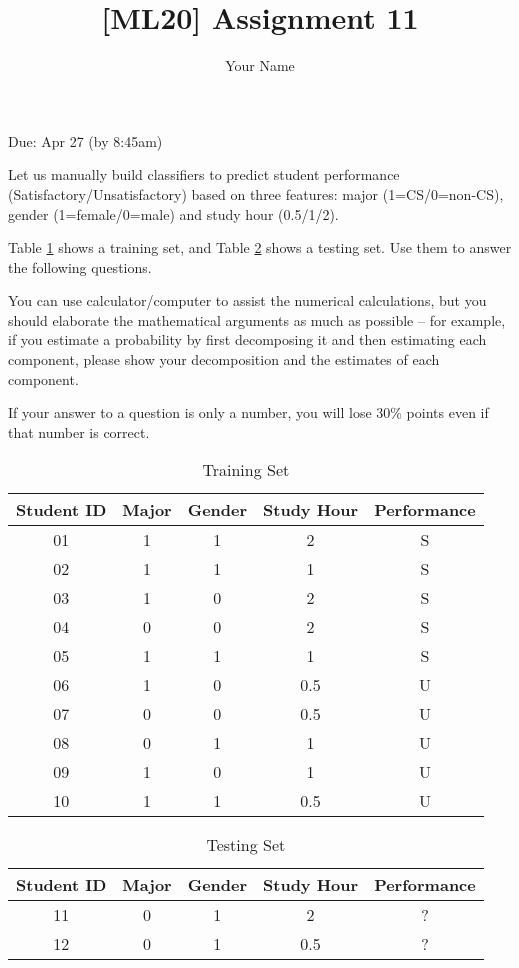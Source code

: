 \documentclass{llncs}
\title{[ML20] Assignment 11}
\author{Your Name}
\institute{}
\begin{document}
\maketitle 

\setlength\parindent{0pt} 
\setlength{\parskip}{10pt}

Due: Apr 27 (by 8:45am) 

Let us manually build classifiers to predict 
student performance (Satisfactory/Unsatisfactory) 
based on three features: major (1=CS/0=non-CS), 
gender (1=female/0=male) and study hour (0.5/1/2). 

Table \ref{tab:hw11_tab1} shows a training set, 
and Table \ref{tab:hw11_tab2} shows a testing set. 
Use them to answer the following questions. 

You can use calculator/computer to assist the numerical
calculations, but you should elaborate the mathematical
arguments as 
much as possible -- for example, if you estimate a 
probability by first decomposing it and then 
estimating each component, please show your 
decomposition and the estimates of each component. 

If your answer to a question is only a number, 
you will lose 30\% points even if that number is correct. 

\begin{table}
\caption{Training Set}
\centering
\setlength{\tabcolsep}{10pt} %
\def\arraystretch{2} %
\begin{tabular}{c|c|c|c|c} \hline 
Student ID & Major & Gender 
& Study Hour & Performance \\ \hline 
01 & 1 & 1 & 2 & S\\ \hline
02 & 1 & 1 & 1 & S\\ \hline 
03 & 1 & 0 & 2 & S\\ \hline
04 & 0 & 0 & 2 & S\\ \hline 
05 & 1 & 1 & 1 & S\\ \hline 
06 & 1 & 0 & 0.5 & U\\ \hline 
07 & 0 & 0 & 0.5 & U\\ \hline
08 & 0 & 1 & 1 & U\\ \hline 
09 & 1 & 0 & 1 & U\\ \hline
10 & 1 & 1 & 0.5 & U\\ \hline 
\end{tabular}
\label{tab:hw11_tab1}
\end{table}

\begin{table}
\caption{Testing Set}
\centering
\setlength{\tabcolsep}{10pt} %
\def\arraystretch{2} %
\begin{tabular}{c|c|c|c|c} \hline 
Student ID & Major & Gender 
& Study Hour & Performance \\ \hline 
11 & 0 & 1 & 2 & ?\\ \hline
12 & 0 & 1 & 0.5 & ?\\ \hline 
\end{tabular}
\label{tab:hw11_tab2}
\end{table}
\end{document}
